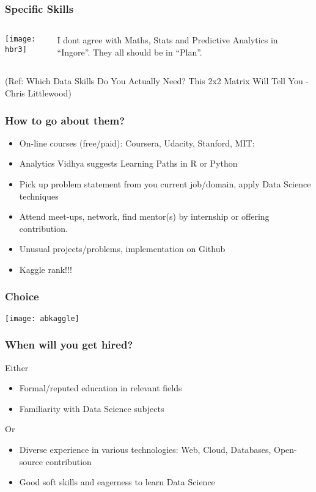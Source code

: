 \begin{frame}[fragile]\frametitle{Specific Skills}
 
   \begin{columns}[t]
    \begin{column}{0.5\linewidth}
\begin{center}
\texttt{[image: hbr3]}
\end{center}
    \end{column}
    \begin{column}{0.5\linewidth}
I dont agree with Maths, Stats and Predictive Analytics in ``Ingore''. They all should be in ``Plan''.
    \end{column}
  \end{columns}
 

{\tiny (Ref: Which Data Skills Do You Actually Need? This 2x2 Matrix Will Tell You - Chris Littlewood)}
\end{frame}


\begin{frame}[fragile]\frametitle{How to go about them?}
\begin{itemize}
\item On-line courses (free/paid): Coursera, Udacity, Stanford, MIT: 
\item Analytics Vidhya suggests Learning Paths in R or Python
\item Pick up problem statement from you current job/domain, apply Data Science techniques
\item Attend meet-ups, network, find mentor(s) by internship or offering contribution.
\item Unusual projects/problems, implementation on Github
\item Kaggle rank!!!
\end{itemize}

\end{frame}

\begin{frame}[fragile]\frametitle{Choice}
\begin{center}
\texttt{[image: abkaggle]}
\end{center}
\end{frame}

\begin{frame}[fragile]\frametitle{When will you get hired?}
Either
\begin{itemize}
\item Formal/reputed education in relevant fields
\item Familiarity with Data Science subjects
\end{itemize}
Or
\begin{itemize}
\item Diverse experience in various technologies: Web, Cloud, Databases, Open-source contribution
\item Good soft skills and eagerness to learn Data Science
\end{itemize}
\end{frame}


